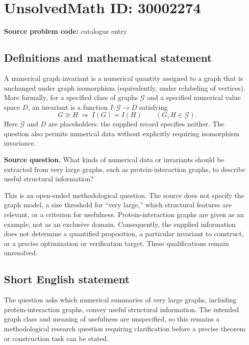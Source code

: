 \documentclass[11pt]{article}
\begin{document}
\section*{UnsolvedMath ID: 30002274}
\textbf{Source problem code:} catalogue entry
\subsection{Definitions and mathematical statement}
A numerical graph invariant is a numerical quantity assigned to a graph that is unchanged under graph isomorphism (equivalently, under relabeling of vertices). More formally, for a specified class of graphs \(\mathcal G\) and a specified numerical value space \(D\), an invariant is a function \(I\colon\mathcal G\to D\) satisfying
\[
G\cong H\ \Longrightarrow\ I(G)=I(H)
\qquad(G,H\in\mathcal G).
\]
Here \(\mathcal G\) and \(D\) are placeholders: the supplied record specifies neither. The question also permits numerical data without explicitly requiring isomorphism invariance.

\textbf{Source question.} What kinds of numerical data or invariants should be extracted from very large graphs, such as protein-interaction graphs, to describe useful structural information?

This is an open-ended methodological question. The source does not specify the graph model, a size threshold for ``very large,'' which structural features are relevant, or a criterion for usefulness. Protein-interaction graphs are given as an example, not as an exclusive domain. Consequently, the supplied information does not determine a quantified proposition, a particular invariant to construct, or a precise optimization or verification target. These qualifications remain unresolved.
\subsection{Short English statement}
The question asks which numerical summaries of very large graphs, including protein-interaction graphs, convey useful structural information. The intended graph class and meaning of usefulness are unspecified, so this remains a methodological research question requiring clarification before a precise theorem or construction task can be stated.
\end{document}
